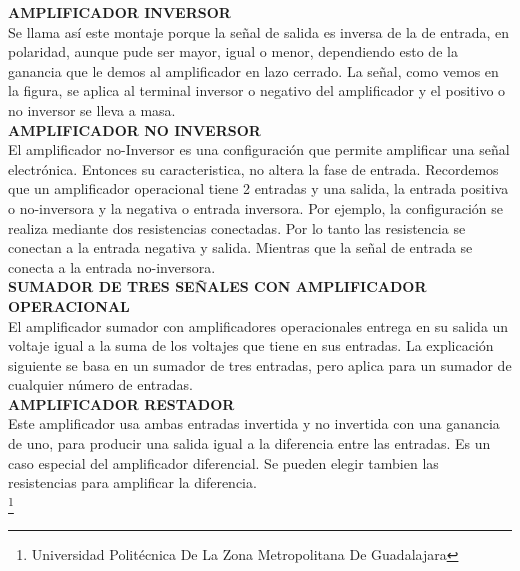 \documentclass[10pt,a4paper]{article}
\begin{document}
\textbf{AMPLIFICADOR INVERSOR}\\
Se llama así este montaje porque la señal de salida es inversa de la de entrada, en polaridad, aunque pude ser mayor, igual o menor, dependiendo esto de la ganancia que le demos al amplificador en lazo cerrado. La señal, como vemos en la figura, se aplica al terminal inversor o negativo del amplificador y el positivo o no inversor se lleva a masa.\\

\textbf{AMPLIFICADOR NO INVERSOR}\\
El amplificador no-Inversor es una configuración que permite amplificar una señal electrónica. Entonces su caracteristica, no altera la fase de entrada. Recordemos que un amplificador operacional tiene 2 entradas y una salida, la entrada positiva o no-inversora y la negativa o entrada inversora. Por ejemplo, la configuración se realiza mediante dos resistencias conectadas. Por lo tanto las resistencia se conectan a la entrada negativa y salida. Mientras que la señal de entrada se conecta a la entrada no-inversora.\\

\textbf{SUMADOR DE TRES SEÑALES CON AMPLIFICADOR OPERACIONAL}\\
El amplificador sumador con amplificadores operacionales entrega en su salida un voltaje igual a la suma de los voltajes que tiene en sus entradas. La explicación siguiente se basa en un sumador de tres entradas, pero aplica para un sumador de cualquier número de entradas.\\

\textbf{AMPLIFICADOR RESTADOR}\\
Este amplificador usa ambas entradas invertida y no invertida con una ganancia de uno, para producir una salida igual a la diferencia entre las entradas. Es un caso especial del amplificador diferencial. Se pueden elegir tambien las resistencias para amplificar la diferencia. \\












\footnote{Universidad Politécnica De La Zona Metropolitana De Guadalajara} 

\newpage
\end{document}
